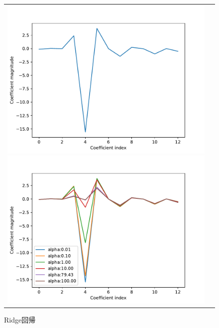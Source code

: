 \documentclass[a4paper,twocolumn]{ujarticle} %
\begin{document}
\begin{figure}[H]
    \begin{tabular}{cc}
    	\begin{minipage}{0.5\hsize}
                	\includegraphics[width=1.0\linewidth]{../img/lr.pdf}
                	\caption{最小2乗法}
               	\label{fig:lr}
    	 \end{minipage}
    	 \begin{minipage}{0.5\hsize}
       		 \includegraphics[width=1.0\linewidth]{../img/ridgeCoef.pdf}
    		 \caption{Ridge回帰}
    		 \label{fig:ridge}
    	 \end{minipage}
	     \end{tabular}
\end{figure}
\end{document}
